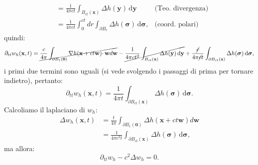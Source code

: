 \documentclass[10pt,a4paper,twoside,openright]{book}
\newcommand{\x}{\mathbf{x}}
\newcommand{\y}{\mathbf{y}}
\newcommand{\zer}{\mathbf{0}}
\newcommand{\sigg}{\bm{\sigma}}
\newcommand{\de}{\,\mathrm d}
\newcommand{\dyy}{\de \y}
\newcommand{\dsig}{\de \sigg}
\begin{document}
\begin{dimostrazione}
\begin{align*}
                                                                                                                                           & =\frac{1}{4\pi ct}\int _{B_{ct}(\x)} \Delta h(\y) \dyy                                                                                                                                            & \text{(Teo. divergenza)} \\
                                                                                                                                           & =\frac{1}{4\pi ct}\int _{0}^{ct} dr\int _{\partial B_{r}} \Delta h(\sigg) \dsig ,                                                                                                                 & \text{(coord. polari)}
    \end{align*}
    quindi:
    \begin{equation*}
        \partial _{tt} w_{h}(\x ,t) =\cancel{\frac{c}{4\pi }\int _{\partial B_{1}(\zer)} \nabla h(\x +ct\mathbf{w}) \cdotp \mathbf{w} d\mathbf{w}} -\cancel{\frac{1}{4\pi ct^{2}}\int _{B_{ct}(\x)} \Delta h(\y) \dyy} +\frac{\cancel{c}}{4\pi \cancel{c} t}\int _{\partial B_{ct}(\x)} \Delta h(\sigg) \dsig ,
    \end{equation*}
    i primi due termini sono uguali (si vede svolgendo i passaggi di prima per tornare indietro), pertanto:
    \begin{equation*}
        \partial _{tt} w_{h}(\x ,t) =\frac{1}{4\pi t}\int _{\partial B_{ct}(\x)} \Delta h(\sigg) \dsig .
    \end{equation*}
    Calcoliamo il laplaciano di $\displaystyle w_{h}$:
    \begin{align*}
        \Delta w_{h}(\x ,t) & =\frac{t}{4\pi }\int _{\partial B_{1}(\zer)} \Delta h(\x +ct\mathbf{w}) d\mathbf{w} \\
                            & =\frac{1}{4\pi c^{2} t}\int _{\partial B_{ct}(\x)} \Delta h(\sigg) \dsig ,
    \end{align*}
    ma allora:
    \begin{equation*}
        \partial _{tt} w_{h} -c^{2} \Delta w_{h} =0.
    \end{equation*}
\end{dimostrazione}
\end{document}
